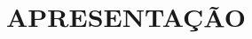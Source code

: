 \captionsetup{justification=centering,margin=0cm}

\chapter[APRESENTAÇÃO]{APRESENTAÇÃO}
\label{cap:apresentação}